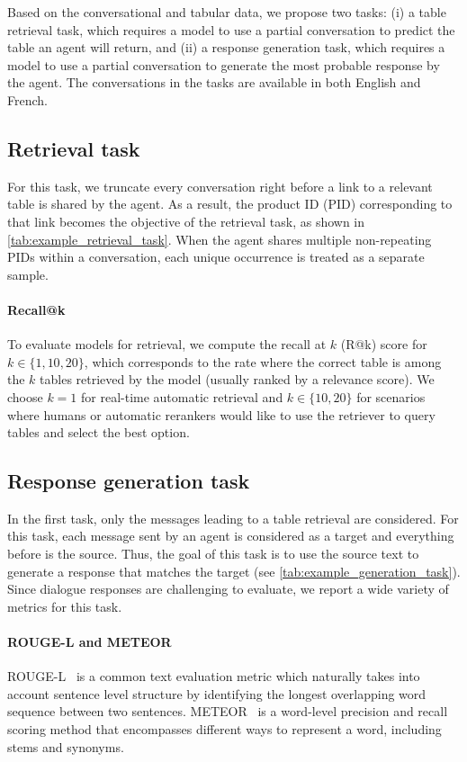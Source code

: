 \documentclass[11pt]{article}
\begin{document}
Based on the conversational and tabular data, we propose two tasks: (i) a table retrieval task, which requires a model to use a partial conversation to predict the table an agent will return, and (ii) a response generation task, which requires a model to use a partial conversation to generate the most probable response by the agent. The conversations in the tasks are available in both English and French. 



\subsection{Retrieval task}
For this task, we truncate every conversation right before a link to a relevant table is shared by the agent. As a result, the product ID (PID) corresponding to that link becomes the objective of the retrieval task, as shown in \autoref{tab:example_retrieval_task}. When the agent shares multiple non-repeating PIDs within a conversation, each unique occurrence is treated as a separate sample.

\paragraph{Recall@k} To evaluate models for retrieval, we compute the recall at $k$ (R@k) score for $k \in \{1,10,20\}$, which corresponds to the rate where the correct table is among the $k$ tables retrieved by the model (usually ranked by a relevance score). We choose $k=1$ for real-time automatic retrieval and $k \in \{10, 20\}$ for scenarios where humans or automatic rerankers would like to use the retriever to query tables and select the best option.




\subsection{Response generation task}
\label{sec:response_generation_task}
In the first task, only the messages leading to a table retrieval are considered. For this task, each message sent by an agent is considered as a target and everything before is the source. Thus, the goal of this task is to use the source text to generate a response that matches the target (see \autoref{tab:example_generation_task}). Since dialogue responses are challenging to evaluate, we report a wide variety of metrics for this task. 




\paragraph{ROUGE-L and METEOR} ROUGE-L~\cite{lin_rouge_2004, lin_automatic_2004} is a common text evaluation metric which naturally takes into account sentence level structure by identifying the longest overlapping word sequence between two sentences. METEOR~\cite{banerjee_meteor_2005} is a word-level precision and recall scoring method that encompasses different ways to represent a word, including stems and synonyms.
\end{document}

